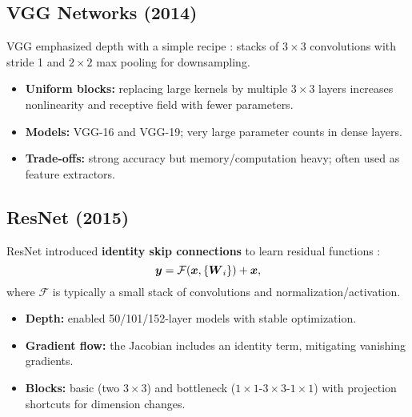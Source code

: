 \subsection{VGG Networks (2014)}

VGG emphasized depth with a simple recipe \cite{GoodfellowEtAl2016}: stacks of $3\times3$ convolutions with stride 1 and $2\times2$ max pooling for downsampling.
\begin{itemize}
    \item \textbf{Uniform blocks:} replacing large kernels by multiple $3\times3$ layers increases nonlinearity and receptive field with fewer parameters.
    \item \textbf{Models:} VGG-16 and VGG-19; very large parameter counts in dense layers.
    \item \textbf{Trade-offs:} strong accuracy but memory/computation heavy; often used as feature extractors.
\end{itemize}

\subsection{ResNet (2015)}
\label{subsec:resnet}

ResNet introduced \textbf{identity skip connections} to learn residual functions \cite{He2016}:
\begin{equation}
\boldsymbol{y} = \mathcal{F}(\boldsymbol{x}, \{\boldsymbol{W}_i\}) + \boldsymbol{x},
\end{equation}
where $\mathcal{F}$ is typically a small stack of convolutions and normalization/activation.

\begin{itemize}
    \item \textbf{Depth:} enabled 50/101/152-layer models with stable optimization.
    \item \textbf{Gradient flow:} the Jacobian includes an identity term, mitigating vanishing gradients.
    \item \textbf{Blocks:} basic (two $3\times3$) and bottleneck ($1\times1$-$3\times3$-$1\times1$) with projection shortcuts for dimension changes.
\end{itemize}

